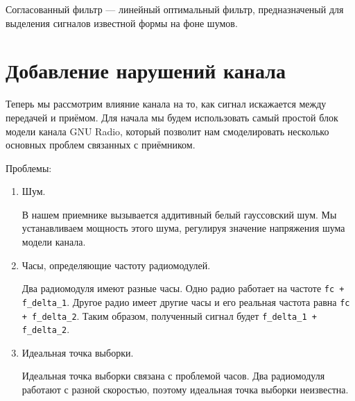 \documentclass[a4paper,12pt]{report}
\begin{document}
     Согласованный фильтр — линейный оптимальный фильтр, предназначеный для выделения сигналов известной формы на фоне шумов.

\chapter{Добавление нарушений канала}
    Теперь мы рассмотрим влияние канала на то, как сигнал искажается между передачей и приёмом. Для начала мы будем использовать самый простой блок модели канала GNU Radio, который позволит нам смоделировать несколько основных проблем связанных с приёмником.
    
    Проблемы: 
\begin{enumerate} 
  \item Шум. 
  
    В нашем приемнике вызывается аддитивный белый гауссовский шум. Мы устанавливаем мощность этого шума, регулируя значение напряжения шума модели канала.
      
  \item Часы, определяющие частоту радиомодулей.
  
    Два радиомодуля имеют разные часы. Одно радио работает на частоте \texttt{fc + f\_delta\_1}. Другое радио имеет другие часы и его реальная частота равна \texttt{fc + f\_delta\_2}. Таким образом, полученный сигнал будет \texttt{f\_delta\_1 + f\_delta\_2}.
    
  \item Идеальная точка выборки.
  
    Идеальная точка выборки связана с проблемой часов. Два радиомодуля работают с разной скоростью, поэтому идеальная точка выборки неизвестна.
\end{enumerate}
\end{document}
